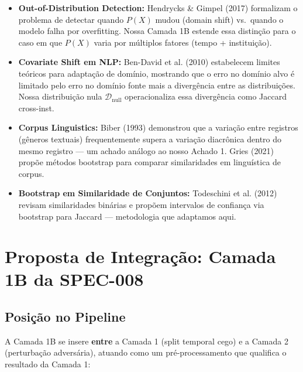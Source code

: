 \documentclass[12pt,a4paper]{article}
\theoremstyle{remark}
\begin{document}
\begin{itemize}[nosep]
  \item \textbf{Out-of-Distribution Detection:} Hendrycks \& Gimpel (2017) \cite{hendrycks2017} formalizam o problema de detectar quando $P(X)$ mudou (domain shift) vs.\ quando o modelo falha por overfitting. Nossa Camada 1B estende essa distinção para o caso em que $P(X)$ varia por múltiplos fatores (tempo + instituição).

  \item \textbf{Covariate Shift em NLP:} Ben-David et al. (2010) \cite{bendavid2010} estabelecem limites teóricos para adaptação de domínio, mostrando que o erro no domínio alvo é limitado pelo erro no domínio fonte mais a divergência entre as distribuições. Nossa distribuição nula $\mathcal{D}_{\text{null}}$ operacionaliza essa divergência como Jaccard cross-inst.

  \item \textbf{Corpus Linguistics:} Biber (1993) \cite{biber1993} demonstrou que a variação entre registros (gêneros textuais) frequentemente supera a variação diacrônica dentro do mesmo registro — um achado análogo ao nosso Achado 1. Gries (2021) \cite{gries2021} propõe métodos bootstrap para comparar similaridades em linguística de corpus.

  \item \textbf{Bootstrap em Similaridade de Conjuntos:} Todeschini et al. (2012) \cite{todeschini2012} revisam similaridades binárias e propõem intervalos de confiança via bootstrap para Jaccard — metodologia que adaptamos aqui.
\end{itemize}

\newpage

\section{Proposta de Integração: Camada 1B da SPEC-008}

\subsection{Posição no Pipeline}

A Camada 1B se insere \textbf{entre} a Camada 1 (split temporal cego) e a Camada 2 (perturbação adversária), atuando como um pré-processamento que qualifica o resultado da Camada 1:
\end{document}
